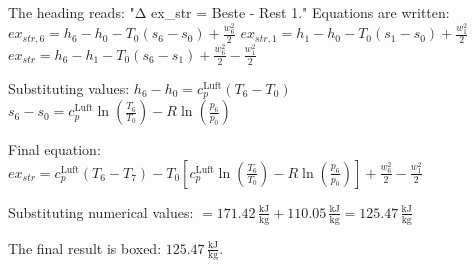 The heading reads: "Δ ex_{str} = Beste - Rest 1."  
Equations are written:  
\( ex_{str,6} = h_6 - h_0 - T_0 \left( s_6 - s_0 \right) + \frac{w_6^2}{2} \)  
\( ex_{str,1} = h_1 - h_0 - T_0 \left( s_1 - s_0 \right) + \frac{w_1^2}{2} \)  
\( ex_{str} = h_6 - h_1 - T_0 \left( s_6 - s_1 \right) + \frac{w_6^2}{2} - \frac{w_1^2}{2} \)  

Substituting values:  
\( h_6 - h_0 = c_p^{\text{Luft}} \left( T_6 - T_0 \right) \)  
\( s_6 - s_0 = c_p^{\text{Luft}} \ln \left( \frac{T_6}{T_0} \right) - R \ln \left( \frac{p_6}{p_0} \right) \)  

Final equation:  
\( ex_{str} = c_p^{\text{Luft}} \left( T_6 - T_7 \right) - T_0 \left[ c_p^{\text{Luft}} \ln \left( \frac{T_6}{T_0} \right) - R \ln \left( \frac{p_6}{p_0} \right) \right] + \frac{w_6^2}{2} - \frac{w_1^2}{2} \)  

Substituting numerical values:  
\( = 171.42 \, \frac{\text{kJ}}{\text{kg}} + 110.05 \, \frac{\text{kJ}}{\text{kg}} = 125.47 \, \frac{\text{kJ}}{\text{kg}} \)  

The final result is boxed: \( 125.47 \, \frac{\text{kJ}}{\text{kg}} \).